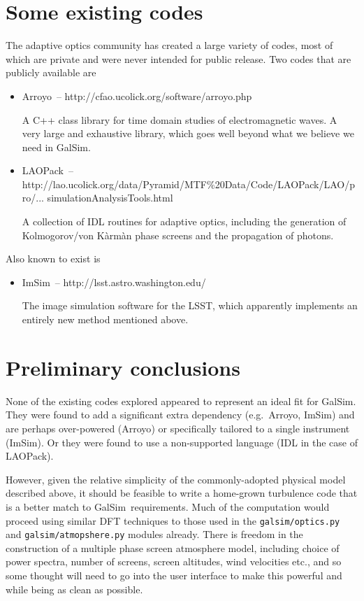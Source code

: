 \documentclass[preprint]{aastex}
\newcommand{\arroyo}{{\sc Arroyo}}
\newcommand{\laopack}{{\sc LAOPack}}
\newcommand{\imsim}{{\sc ImSim}}
\newcommand{\galsim}{{\sc GalSim}}
\begin{document}
\section{Some existing codes}
The adaptive optics community has created a large variety of codes, most of which are private and
were never intended for public release. Two codes that are publicly available are

\begin{itemize}

\item \arroyo\ -- http://cfao.ucolick.org/software/arroyo.php

  A C++ class library for time domain studies of electromagnetic waves. A very large and exhaustive
  library, which goes well beyond what we believe we need in \galsim.


\item \laopack\ --
  http://lao.ucolick.org/data/Pyramid/MTF\%20Data/Code/LAOPack/LAO/pro/...
  simulationAnalysisTools.html

  A collection of IDL routines for adaptive optics, including the generation of Kolmogorov/von
  K\`arm\`an phase screens and the propagation of photons.
  
\end{itemize}

Also known to exist is

\begin{itemize}

\item \imsim\ -- http://lsst.astro.washington.edu/

  The image simulation software for the LSST, which apparently implements an entirely new method
  mentioned above.

\end{itemize}



\section{Preliminary conclusions}
None of the existing codes explored appeared to represent an ideal fit
for \galsim.  They were found to add a significant extra dependency (e.g.\
\arroyo, \imsim) and are perhaps over-powered (\arroyo) or
specifically tailored to a single instrument (\imsim).  Or they were
found to use a  non-supported language (IDL in the case of \laopack).

However, given the relative simplicity of the commonly-adopted
physical model described above, it should be feasible to write a
home-grown turbulence code that is a better match to \galsim\
requirements.   Much of the computation would proceed using
similar DFT techniques to those used in the \texttt{galsim/optics.py} and \texttt{galsim/atmopshere.py}
modules already.   There is freedom in the
construction of a multiple phase screen atmosphere model, including
choice of power spectra, number of screens, screen altitudes, wind
velocities etc., and so some thought will need to go into the user
interface to make this powerful and while being as clean as possible.
 
\end{document}
